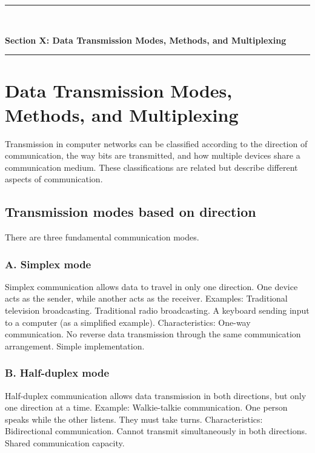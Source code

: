 \newpage

\newpage
\begin{center}
\vspace{0.5em}
{\color{primary}\rule{0.45\textwidth}{1.2pt}\\[4pt]}
{\Large\bfseries\color{primary} Section X: Data Transmission Modes, Methods, and Multiplexing\\[2pt]}
{\color{primary}\rule{0.45\textwidth}{1.2pt}}
\vspace{0.5em}
\end{center}

\section{Data Transmission Modes, Methods, and Multiplexing}

Transmission in computer networks can be classified according to the direction of communication, the way bits are transmitted, and how multiple devices share a communication medium.
These classifications are related but describe different aspects of communication.
\subsection{Transmission modes based on direction}
There are three fundamental communication modes.
\subsubsection{A. Simplex mode}
Simplex communication allows data to travel in only one direction.
One device acts as the sender, while another acts as the receiver.
Examples:
Traditional television broadcasting.
Traditional radio broadcasting.
A keyboard sending input to a computer (as a simplified example).
Characteristics:
One-way communication.
No reverse data transmission through the same communication arrangement.
Simple implementation.
\subsubsection{B. Half-duplex mode}
Half-duplex communication allows data transmission in both directions, but only one direction at a time.
Example: Walkie-talkie communication.
One person speaks while the other listens. They must take turns.
Characteristics:
Bidirectional communication.
Cannot transmit simultaneously in both directions.
Shared communication capacity.
